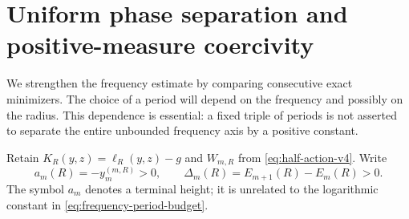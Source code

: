 \section{Uniform phase separation and positive-measure coercivity}
\label{sec:periodic-coercivity}
We strengthen the frequency estimate by comparing consecutive exact
minimizers. The choice of a period will depend on the frequency and
possibly on the radius. This dependence is essential: a fixed triple
of periods is not asserted to separate the entire unbounded frequency
axis by a positive constant.

Retain $K_R(y,z)=\ell_R(y,z)-g$ and $W_{m,R}$ from
\eqref{eq:half-action-v4}. Write
\[
 a_m(R)=-y_m^{(m,R)}>0,\qquad
 \Delta_m(R)=E_{m+1}(R)-E_m(R)>0.
\]
The symbol $a_m$ denotes a terminal height; it is unrelated to the
logarithmic constant in \eqref{eq:frequency-period-budget}.

